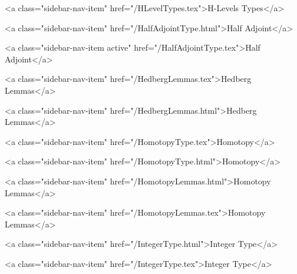       
        
          <a class="sidebar-nav-item" href="/HLevelTypes.tex">H-Levels Types</a>
        
      
    
      
        
          <a class="sidebar-nav-item" href="/HalfAdjointType.html">Half Adjoint</a>
        
      
    
      
        
          <a class="sidebar-nav-item active" href="/HalfAdjointType.tex">Half Adjoint</a>
        
      
    
      
        
          <a class="sidebar-nav-item" href="/HedbergLemmas.tex">Hedberg Lemmas</a>
        
      
    
      
        
          <a class="sidebar-nav-item" href="/HedbergLemmas.html">Hedberg Lemmas</a>
        
      
    
      
        
          <a class="sidebar-nav-item" href="/HomotopyType.tex">Homotopy</a>
        
      
    
      
        
          <a class="sidebar-nav-item" href="/HomotopyType.html">Homotopy</a>
        
      
    
      
        
          <a class="sidebar-nav-item" href="/HomotopyLemmas.html">Homotopy Lemmas</a>
        
      
    
      
        
          <a class="sidebar-nav-item" href="/HomotopyLemmas.tex">Homotopy Lemmas</a>
        
      
    
      
        
          <a class="sidebar-nav-item" href="/IntegerType.html">Integer Type</a>
        
      
    
      
        
          <a class="sidebar-nav-item" href="/IntegerType.tex">Integer Type</a>
        
      
    
